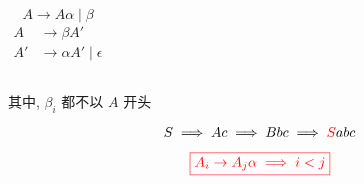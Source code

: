 

\begin{frame}{}
  \begin{center}
  \end{center}

  \begin{columns}
      \[
        A \to A \alpha \mid \beta
      \]
      \begin{align*}
        A &\to \beta A' \\[5pt]
        A' &\to \alpha A' \mid \epsilon
      \end{align*}
  \end{columns}
\end{frame}

\begin{frame}{}
  \begin{center}
    
    其中, $\beta_{i}$ 都不以 $A$ 开头

    \vspace{0.30cm}
    
  \end{center}
\end{frame}

\begin{frame}{}
  \begin{center}

    \vspace{-0.30cm}
    

    \vspace{-0.30cm}
    \[
      S \implies Ac \implies Bbc \implies \textcolor{red}{S}abc
    \]

    \pause
	\vspace{-0.30cm}
    \[
      \textcolor{red}{\boxed{A_{i} \to A_{j} \alpha \implies i < j}}
    \]

    \pause
  \end{center}
\end{frame}

